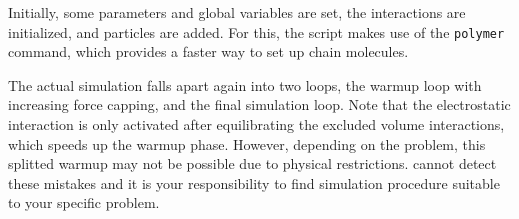 Initially, some parameters and global variables are set, the
interactions are initialized, and particles are added. For this, the
script makes use of the \verb|polymer| command, which provides a
faster way to set up chain molecules.

The actual simulation falls apart again into two loops, the warmup
loop with increasing force capping, and the final simulation loop.
Note that the electrostatic interaction is only activated after
equilibrating the excluded volume interactions, which speeds up the
warmup phase. However, depending on the problem, this splitted warmup
may not be possible due to physical restrictions. \es{} cannot detect
these mistakes and it is your responsibility to find simulation
procedure suitable to your specific problem.

